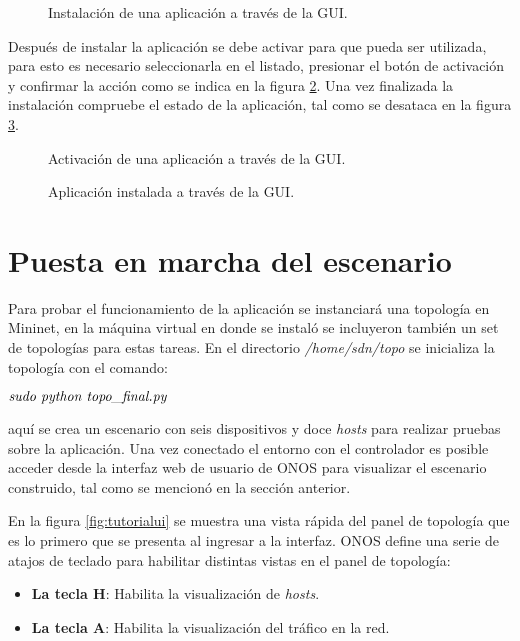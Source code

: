 \begin{figure}[H]
	\centering 
	\caption[Instalación de una aplicación a través de la GUI]{Instalación de una aplicación a través de la GUI.}
	\label{fig:appinstall2}
\end{figure}

Después de instalar la aplicación se debe activar para que pueda ser utilizada, para esto es necesario seleccionarla en el listado, presionar el botón de activación y confirmar la acción como se indica en la figura \ref{fig:appinstall3}. Una vez finalizada la instalación compruebe el estado de la aplicación, tal como se desataca en la figura \ref{fig:appinstall4}.

\begin{figure}[H]
	\centering 
	\caption[Activación de una aplicación a través de la GUI]{Activación de una aplicación a través de la GUI.}
	\label{fig:appinstall3}
\end{figure}

\begin{figure}[H]
	\centering 
	\caption[Aplicación instalada a traves de la GUI]{Aplicación instalada a través de la GUI.}
	\label{fig:appinstall4}
\end{figure}
\section{Puesta en marcha del escenario}
Para probar el funcionamiento de la aplicación se instanciará una topología en Mininet, en la máquina virtual en donde se instaló se incluyeron también un set de topologías para estas tareas. En el directorio \textit{/home/sdn/topo} se inicializa la topología con el comando:
\begin{center}
    $ \emph {sudo python topo\_final.py}$
\end{center}
aquí se crea un escenario con seis dispositivos y doce \textit{hosts} para realizar pruebas sobre la aplicación. Una vez conectado el entorno  con el controlador es posible acceder desde la interfaz web de usuario de ONOS para visualizar el escenario construido, tal como se mencionó en la sección anterior.

En la figura \ref{fig:tutorialui} se muestra una vista rápida del panel de topología que es lo primero que se presenta al ingresar a la interfaz. ONOS define una serie de atajos de teclado para habilitar distintas vistas en el panel de topología:
\begin{itemize}
    \item \textbf{La tecla H}: Habilita la visualización de \textit{hosts}.
    \item \textbf{La tecla A}: Habilita la visualización del tráfico en la red.
\end{itemize}


